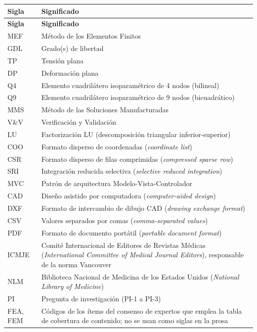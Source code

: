 \begin{longtable}{@{}p{2.4cm}p{11.4cm}@{}}
\toprule
\textbf{Sigla} & \textbf{Significado} \\
\midrule
\endfirsthead
\toprule
\textbf{Sigla} & \textbf{Significado} \\
\midrule
\endhead
\bottomrule
\endfoot
MEF & Método de los Elementos Finitos \\
GDL & Grado(s) de libertad \\
TP & Tensión plana \\
DP & Deformación plana \\
Q4 & Elemento cuadrilátero isoparamétrico de 4 nodos (bilineal) \\
Q9 & Elemento cuadrilátero isoparamétrico de 9 nodos (bicuadrático) \\
MMS & Método de las Soluciones Manufacturadas \\
V\&V & Verificación y Validación \\
LU & Factorización LU (descomposición triangular inferior-superior) \\
COO & Formato disperso de coordenadas (\emph{coordinate list}) \\
CSR & Formato disperso de filas comprimidas (\emph{compressed sparse row}) \\
SRI & Integración reducida selectiva (\emph{selective reduced integration}) \\
MVC & Patrón de arquitectura Modelo-Vista-Controlador \\
CAD & Diseño asistido por computadora (\emph{computer-aided design}) \\
DXF & Formato de intercambio de dibujo CAD (\emph{drawing exchange format}) \\
CSV & Valores separados por comas (\emph{comma-separated values}) \\
PDF & Formato de documento portátil (\emph{portable document format}) \\
ICMJE & Comité Internacional de Editores de Revistas Médicas (\emph{International Committee of Medical Journal Editors}), responsable de la norma Vancouver \\
NLM & Biblioteca Nacional de Medicina de los Estados Unidos (\emph{National Library of Medicine}) \\
PI & Pregunta de investigación (PI-1 a PI-3) \\
FEA, FEM & Códigos de los ítems del consenso de expertos que emplea la tabla de cobertura de contenido; no se usan como siglas en la prosa \\
\end{longtable}
\renewcommand{\arraystretch}{1.0}

\setcounter{table}{0}
